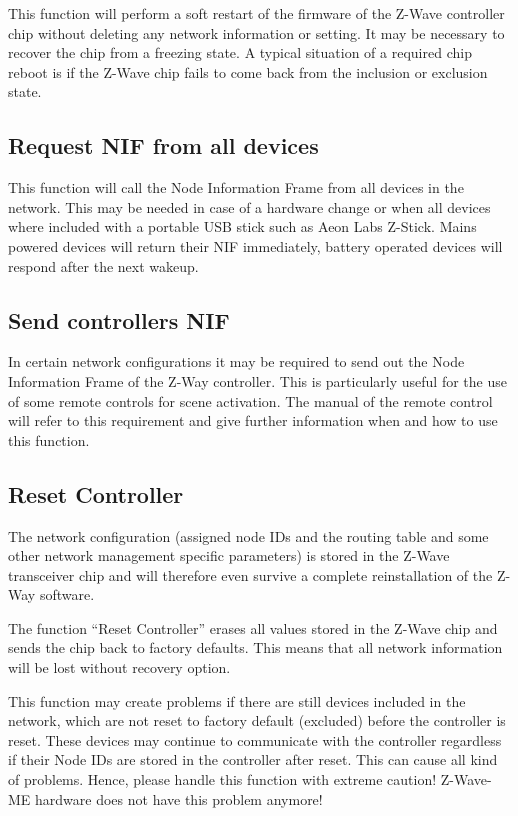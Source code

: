 This function will perform a soft restart of the firmware of the Z-Wave controller chip without 
deleting any network information or setting. It may be necessary to recover the chip from a 
freezing state. A typical situation of a required chip reboot is if the Z-Wave chip fails to 
come back from the inclusion or exclusion state.

\subsection{Request NIF from all devices}

This function will call the Node Information Frame from all devices in the network. This may be 
needed in case of a hardware change or when all devices where included with a portable USB stick 
such as Aeon Labs Z-Stick.  Mains powered devices will return their NIF immediately, battery operated 
devices will respond after the next wakeup.

\subsection{Send controllers NIF}

In certain network configurations it may be required to send out the Node Information Frame of 
the Z-Way controller. This is particularly useful for the use of some remote controls for 
scene activation. The manual of the remote control will refer to this requirement and give further 
information when and how to use this function.

\subsection{Reset Controller}

The network configuration (assigned node IDs and the routing table and some other network 
management specific parameters) is stored in the Z-Wave transceiver chip and will therefore 
even survive a complete reinstallation of the Z-Way software.

The function “Reset Controller” erases all values stored in the Z-Wave chip and sends the chip 
back to factory defaults. This means that all network information will be lost without recovery option.

This function may create problems if there are still devices included in the network, which 
are not reset to factory default (excluded) before the controller is reset. These devices may 
continue to communicate with the controller regardless if their Node IDs are stored in the 
controller after reset. This can cause all kind of problems. Hence, please handle this 
function with extreme caution!  
Z-Wave-ME hardware does not have this problem anymore!

